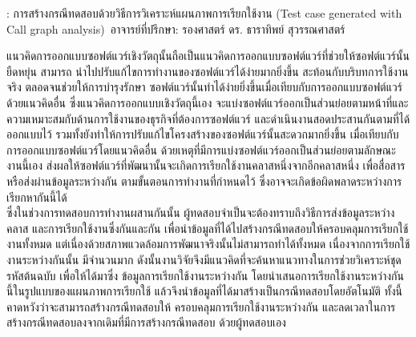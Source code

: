 
\begin{abstractquote}
\studentname : การสร้างกรณีทดสอบด้วยวิธีการวิเคราะห์แผนภาพการเรียกใช้งาน
(Test case generated with Call graph analysis)
\,อาจารย์ที่ปรึกษา: รองศาสตร์ ดร. ธาราทิพย์ สุวรรณศาสตร์
\end{abstractquote}

แนวคิดการออกแบบซอฟต์แวร์เชิงวัตถุนั้นถือเป็นแนวคิดการออกแบบซอฟต์แวร์ที่ช่วยให้ซอฟต์แวร์นั้นยืดหยุ่น สามารถ
นำไปปรับแก้ไขการทำงานของซอฟต์แวร์ได้ง่ายมากยิ่งขึ้น สะท้อนกับบริบทการใช้งานจริง ตลอดจนช่วยให้การบำรุงรักษา
ซอฟต์แวร์นั้นทำได้ง่ายยิ่งขึ้นเมื่อเทียบกับการออกแบบซอฟต์แวร์ด้วยแนวคิดอื่น ซึ่งแนวคิดการออกแบบเชิงวัตถุนี้เอง
จะแบ่งซอฟต์แวร์ออกเป็นส่วนย่อยตามหน้าที่และความเหมาะสมกับด้านการใช้งานของธุรกิจที่ต้องการซอฟต์แวร์
และดำเนินงานสอดประสานกันตามที่ได้ออกแบบไว้ รวมทั้งยังทำให้การปรับแก้ไขโครงสร้างของซอฟต์แวร์นั้นสะดวกมากยิ่งขึ้น
เมื่อเทียบกับการออกแบบซอฟต์แวร์โดยแนวคิดอื่น ด้วยเหตุที่มีการแบ่งซอฟต์แวร์ออกเป็นส่วนย่อยตามลักษณะงานนี้เอง
ส่งผลให้ซอฟต์แวร์ที่พัฒนานั้นจะเกิดการเรียกใช้งานคลาสหนึ่งจากอีกคลาสหนึ่ง เพื่อสื่อสารหรือส่งผ่านข้อมูลระหว่างกัน 
ตามขั้นตอนการทำงานที่กำหนดไว้ ซึ่งอาจจะเกิดข้อผิดพลาดระหว่างการเรียกหากันนี้ได้ \\ 

ซึ่งในช่วงการทดสอบการทำงานผสานกันนั้น ผู้ทดสอบจำเป็นจะต้องทราบถึงวิธีการส่งข้อมูลระหว่างคลาส
และการเรียกใช้งานซึ่งกันและกัน เพื่อนำข้อมูลที่ได้ไปสร้างกรณีทดสอบให้ครอบคลุมการเรียกใช้งานทั้งหมด
แต่เนื่องด้วยสภาพแวดล้อมการพัฒนาจริงนั้นไม่สามารถทำได้ทั้งหมด เนื่องจากการเรียกใช้งานระหว่างกันนั้น
มีจำนวนมาก ดังนั้นงานวิจัยจึงมีแนวคิดที่จะค้นหาแนวทางในการช่วยวิเคราะห์ชุดรหัสต้นฉบับ เพื่อให้ได้มาซึ่ง
ข้อมูลการเรียกใช้งานระหว่างกัน โดยนำเสนอการเรียกใช้งานระหว่างกันนี้ในรูปแบบของแผนภาพการเรียกใช้
แล้วจึงนำข้อมูลที่ได้มาสร้างเป็นกรณีทดสอบโดยอัตโนมัติ ทั้งนี้คาดหวังว่าจะสามารถสร้างกรณีทดสอบให้
ครอบคลุมการเรียกใช้งานระหว่างกัน และลดเวลาในการสร้างกรณีทดสอบลงจากเดิมที่มีการสร้างกรณีทดสอบ
ด้วยผู้ทดสอบเอง

